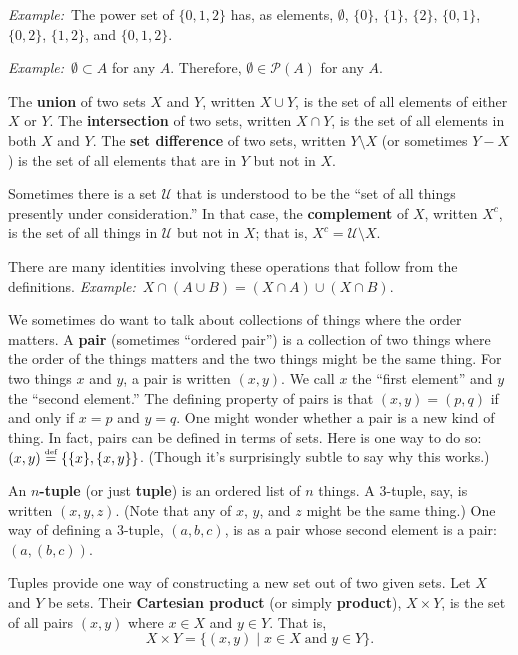 \documentclass[12pt, a4paper]{article}
\newcommand{\defn}[1]{\textbf{#1}}
\newcommand{\isdef}{\stackrel{\text{\tiny def}}{=}}
\newcommand{\eg}{\emph{Example:}\relax}
\begin{document}
\eg\ The power set of $\{0,1,2\}$ has, as elements, $\emptyset$, $\{0\}$,
$\{1\}$, $\{2\}$, $\{0,1\}$, $\{0,2\}$, $\{1,2\}$, and $\{0,1,2\}$.

\eg\ $\emptyset \subset A$ for any $A$. Therefore, $\emptyset \in \mathcal{P}(A)$ for any $A$. 

The \defn{union} of two sets $X$ and $Y$, written $X \cup Y$, is the set
of all elements of either $X$ or $Y$. The \defn{intersection} of two
sets, written $X \cap Y$, is the set of all elements in both $X$ and
$Y$. The \defn{set difference} of two sets, written $Y \setminus X$ (or
sometimes $Y-X$) is the set of all elements that are in $Y$ but not in
$X$.

Sometimes there is a set $\mathcal{U}$ that is understood to be the “set of all
things presently under consideration.” In that case, the
\defn{complement} of $X$, written $X^c$, is the set of all things in
$\mathcal{U}$ but not in $X$; that is, $X^c = \mathcal{U} \setminus X$. 

There are many identities involving these operations that follow from
the definitions.
\eg\ $X\cap(A\cup B) = (X\cap A) \cup (X\cap B)$.

We sometimes do want to talk about collections of things where the
order matters. A \defn{pair} (sometimes “ordered pair”) is a
collection of two things where the order of the things matters and the
two things might be the same thing. For two things $x$ and $y$, a pair
is written $(x, y)$. We call $x$ the “first element” and $y$ the
“second element.” The defining property of pairs is that $(x,y)=(p,q)$
if and only if $x=p$ and $y=q$. One might wonder whether a pair is a
new kind of thing. In fact, pairs can be defined in terms of
sets. Here is one way to do so: $(x, y) \isdef \{\{x\},
\{x,y\}\}$. (Though it's surprisingly subtle to say why this works.)

An \defn{$n$-tuple} (or just \defn{tuple}) is an ordered list of $n$
things. A 3-tuple, say, is written $(x, y, z)$. (Note that any of $x$,
$y$, and $z$ might be the same thing.) One way of defining a 3-tuple,
$(a, b, c)$, is as a pair whose second element is a pair: $(a, (b,
c))$.
  
Tuples provide one way of constructing a new set out of two given
sets. Let $X$ and $Y$ be sets. Their \defn{Cartesian product} (or
simply \defn{product}), $X \times Y$, is the set of all pairs $(x, y)$
where $x \in X$ and $y \in Y$. That is,
\begin{equation*}
X\times Y = \{(x, y) \mid x\in X\;\text{and}\; y\in Y\}.
\end{equation*}
\end{document}
